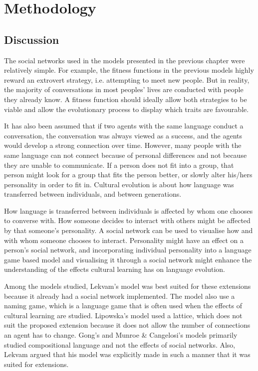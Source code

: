 \acresetall
\chapter{Methodology}\label{ch:Methodology}

\section{Discussion}
The social networks used in the models presented in the previous chapter were relatively simple. For example, the fitness functions in the previous models highly reward an extrovert strategy, i.e. attempting to meet new people. But in reality, the majority of conversations in most peoples' lives are conducted with people they already know. A fitness function should ideally allow both strategies to be viable and allow the evolutionary process to display which traits are favourable.

It has also been assumed that if two agents with the same language conduct a conversation, the conversation was always viewed as a success, and the agents would develop a strong connection over time. However, many people with the same language can not connect because of personal differences and not because they are unable to communicate. If a person does not fit into a group, that person might look for a group that fits the person better, or slowly alter his/hers personality in order to fit in. Cultural evolution is about how language was transferred between individuals, and between generations. 

How language is transferred between individuals is affected by whom one chooses to converse with. How someone decides to interact with others might be affected by that someone’s personality. A social network can be used to visualise how and with whom someone chooses to interact. Personality might have an effect on a person’s social network, and incorporating individual personality into a language game based model and visualising it through a social network might enhance the understanding of the effects cultural learning has on language evolution. 

Among the models studied, Lekvam’s model was best suited for these extensions because it already had a social network implemented. The model also use a naming game, which is a language game that is often used when the effects of cultural learning are studied. Lipowska’s model used a lattice, which does not suit the proposed extension because it does not allow the number of connections an agent has to change. Gong’s and Munroe \& Cangelosi’s models primarily studied compositional language and not the effects of social networks. Also, Lekvam argued that his model was explicitly made in such a manner that it was suited for extensions.

